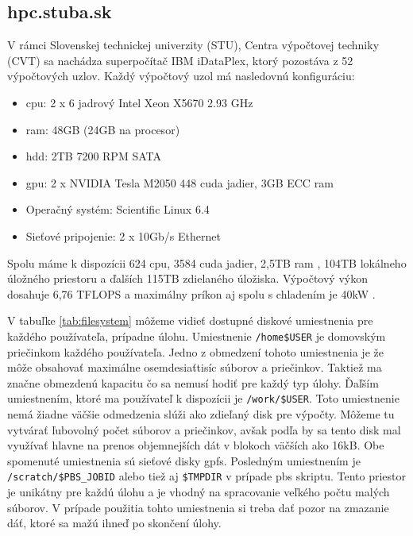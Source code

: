 \subsection{hpc.stuba.sk}
V rámci Slovenskej technickej univerzity (STU), Centra výpočtovej techniky (CVT) sa nachádza superpočítač IBM iDataPlex, ktorý pozostáva z 52 výpočtových uzlov.
Každý výpočtový uzol má nasledovnú konfiguráciu:
\begin{itemize}
\item \acrshort{cpu}: 2 x 6 jadrový Intel Xeon X5670 2.93 GHz
\item \acrshort{ram}: 48GB (24GB na procesor)
\item \acrshort{hdd}: 2TB 7200 RPM SATA
\item \acrshort{gpu}: 2 x NVIDIA Tesla M2050 448 cuda jadier, 3GB ECC \acrshort{ram}
\item Operačný systém: Scientific Linux 6.4
\item Sieťové pripojenie: 2 x 10Gb/s Ethernet
\end{itemize}
Spolu máme k dispozícii 624 \acrshort{cpu}, 3584 cuda jadier, 2,5TB \acrshort{ram} , 104TB lokálneho úložného priestoru a ďalších 115TB zdielaného úložiska.
Výpočtový výkon dosahuje 6,76 TFLOPS a maximálny príkon aj spolu s chladením je 40kW \cite{hpc}.

V tabuľke \ref{tab:filesystem} môžeme vidieť dostupné diskové umiestnenia pre každého používateľa, prípadne úlohu.
Umiestnenie \texttt{/home\$USER} je domovským priečinkom každého používateľa.
Jedno z obmedzení tohoto umiestnenia je že môže obsahovať maximálne osemdesiaťtisíc súborov a priečinkov.
Taktiež ma značne obmezdenú kapacitu čo sa nemusí hodiť pre každý typ úlohy.
Ďaľším umiestnením, ktoré ma používateľ k dispozícii je \texttt{/work/\$USER}.
Toto umiestnenie nemá žiadne väčšie odmedzenia slúži ako zdieľaný disk pre výpočty.
Môžeme tu vytvárať ľubovolný počet súborov a priečinkov, avšak podľa \cite{hpc} by sa tento disk mal využívať hlavne na prenos objemnejších dát v blokoch väčších ako 16kB. Obe spomenuté umiestnenia sú sieťové disky \acrshort{gpfs}.
Posledným umiestnením je \texttt{/scratch/\$PBS\_JOBID} alebo tiež aj \texttt{\$TMPDIR} v prípade \acrshort{pbs} skriptu.
Tento priestor je unikátny pre každú úlohu a je vhodný na spracovanie veľkého počtu malých súborov.
V prípade použitia tohto umiestnenia si treba dať pozor na zmazanie dáť, ktoré sa mažú ihneď po skončení úlohy.

